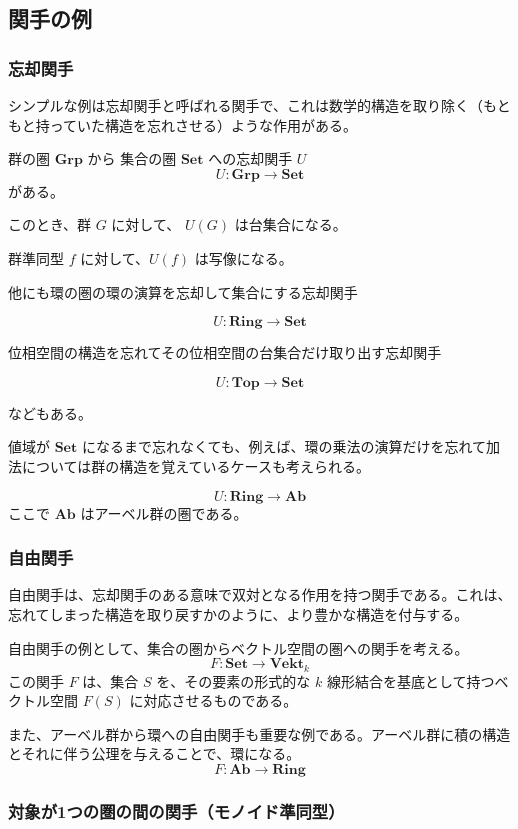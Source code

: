 \documentclass[uplatex,a4j,12pt,dvipdfmx]{jsarticle}
\begin{document}
\subsection{関手の例}

\subsubsection{忘却関手}

シンプルな例は忘却関手と呼ばれる関手で、これは数学的構造を取り除く（もともと持っていた構造を忘れさせる）ような作用がある。

群の圏
$\textbf{Grp}$
から
集合の圏
$\textbf{Set}$
への忘却関手 $U$
$$
	U : \textbf{Grp} \to \textbf{Set}
$$
がある。

このとき、群 $G$ に対して、 $U(G)$ は台集合になる。

群準同型 $f$ に対して、$U(f)$ は写像になる。

他にも環の圏の環の演算を忘却して集合にする忘却関手

$$U: \textbf{Ring} \to \textbf{Set}$$

位相空間の構造を忘れてその位相空間の台集合だけ取り出す忘却関手

$$U: \textbf{Top} \to \textbf{Set}$$

などもある。

値域が $\textbf{Set}$ になるまで忘れなくても、例えば、環の乗法の演算だけを忘れて加法については群の構造を覚えているケースも考えられる。

$$ U : \textbf{Ring} \to \textbf{Ab} $$
ここで $\textbf{Ab}$ はアーベル群の圏である。


\subsubsection{自由関手}

自由関手は、忘却関手のある意味で双対となる作用を持つ関手である。これは、忘れてしまった構造を取り戻すかのように、より豊かな構造を付与する。

自由関手の例として、集合の圏からベクトル空間の圏への関手を考える。
$$F : \textbf{Set} \to \textbf{Vekt}_{k}$$
この関手 $F$ は、集合 $S$ を、その要素の形式的な $k$ 線形結合を基底として持つベクトル空間 $F(S)$ に対応させるものである。

また、アーベル群から環への自由関手も重要な例である。アーベル群に積の構造とそれに伴う公理を与えることで、環になる。
$$F : \textbf{Ab} \to \textbf{Ring}$$


\subsubsection{対象が1つの圏の間の関手（モノイド準同型）}
\end{document}
